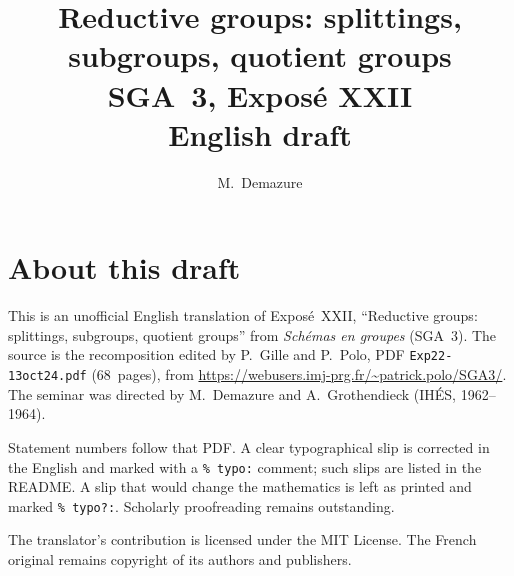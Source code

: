 \documentclass[11pt,a4paper,oneside]{amsbook}
\title[SGA~3, Expos\'e XXII (English draft)]{Reductive groups: splittings, subgroups, quotient groups\\
{\normalsize SGA~3, Expos\'e XXII\\English draft}}
\author{M.\ Demazure}
\date{}
\begin{document}
\frontmatter
\maketitle

\chapter*{About this draft}
This is an unofficial English translation of Expos\'e~XXII, ``Reductive groups: splittings, subgroups, quotient groups''
from \textit{Sch\'emas en groupes} (SGA~3).
The source is the recomposition edited by P.~Gille and P.~Polo,
PDF \texttt{Exp22-13oct24.pdf} (68~pages),
from \url{https://webusers.imj-prg.fr/~patrick.polo/SGA3/}.
The seminar was directed by M.~Demazure and A.~Grothendieck
(IH\'ES, 1962--1964).

Statement numbers follow that PDF. A clear typographical slip is
corrected in the English and marked with a \texttt{\% typo:} comment;
such slips are listed in the README. A slip that would change the
mathematics is left as printed and marked \texttt{\% typo?:}.
Scholarly proofreading remains outstanding.

The translator's contribution is licensed under the MIT License.
The French original remains copyright of its authors and publishers.

\tableofcontents
\mainmatter












\end{document}
